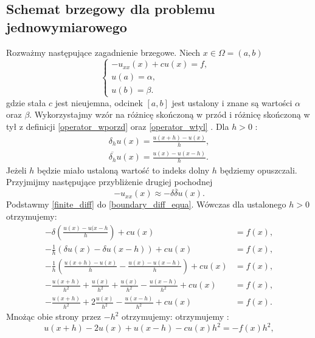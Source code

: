 \documentclass[12pt,a4paper]{report}
\begin{document}
\subsection{Schemat brzegowy dla problemu jednowymiarowego}
Rozważmy następujące zagadnienie brzegowe. Niech $ x \in \Omega = (a,b) $
\begin{equation} \label{boundary_diff_equa}
\left\{ \begin{array}{ll}
-u_{xx}(x) + cu(x) =f, & \\
u(a) = \alpha, & \\
u(b) = \beta. & 
\end{array} \right.
\end{equation}
gdzie stała $c$ jest nieujemna, odcinek $ [a,b]$ jest ustalony i znane są wartości $\alpha$ oraz $\beta$. Wykorzystajmy wzór na różnicę skończoną w przód i różnicę skończoną w tył z definicji \ref{operator_wporzd} oraz \ref{operator_wtyl} . Dla $h>0$ :
\begin{equation} \label{finite_diff}
\begin{array}{c}
\delta_h u(x) = \frac{u(x+h) - u(x)}{h},   \\
\overline{\delta_h} u(x) = \frac{u(x)-u(x-h)}{h} . 
\end{array}
\end{equation}
Jeżeli $h$ będzie miało ustaloną wartość to indeks dolny $h$ będziemy opuszczali. Przyjmijmy następujące przybliżenie drugiej pochodnej
$$
-u_{xx}(x) \approx -\delta \overline{\delta} u(x).
$$
Podstawmy \eqref{finite_diff} do \eqref{boundary_diff_equa}. Wówczas dla ustalonego $h>0$ otrzymujemy: 
\begin{equation}
\begin{array}{rl}
-\delta (\frac{u(x)-u(x-h}{h}) + cu(x) &= f(x),  \\
- \frac{1}{h} (\delta u(x) - \delta u(x-h) ) + cu(x) &= f(x), \\
-\frac{1}{h} (\frac{u(x+h)-u(x)}{h} - \frac{u(x)-u(x-h)}{h}) + cu(x) &= f(x), \\
-\frac{u(x+h)}{h^2} + \frac{u(x)}{h^2} + \frac{u(x)}{h^2} - \frac{u(x-h)}{h^2} +cu(x)& = f(x), \\
-\frac{u(x+h)}{h^2} + 2\frac{u(x)}{h^2} - \frac{u(x-h)}{h^2} +cu(x) &= f(x) .
\end{array}
\end{equation}
Mnożąc obie strony przez $-h^2$ otrzymujemy:  otrzymujemy :
\begin{equation}
u(x+h) - 2u(x) + u(x-h) - cu(x)h^2 = -f(x)h^2,
\end{equation}
\end{document}
